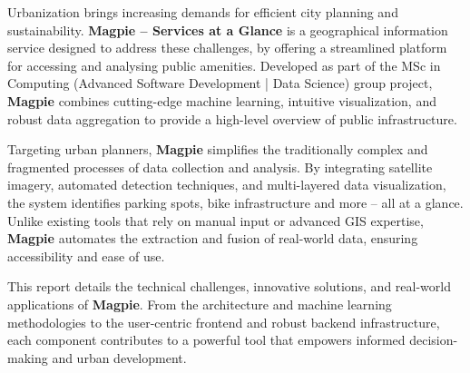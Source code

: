 Urbanization brings increasing demands for efficient city planning and
sustainability. \textbf{Magpie – Services at a Glance} is a geographical
information service designed to address these challenges, by offering a
streamlined platform for accessing and analysing public amenities. Developed as
part of the MSc in Computing (Advanced Software Development | Data Science)
group project, \textbf{Magpie} combines cutting-edge machine learning, intuitive
visualization, and robust data aggregation to provide a high-level overview of
public infrastructure.

Targeting urban planners, \textbf{Magpie} simplifies the traditionally complex
and fragmented processes of data collection and analysis. By integrating
satellite imagery, automated detection techniques, and multi-layered data
visualization, the system identifies parking spots, bike infrastructure and more
-- all at a glance. Unlike existing tools that rely on manual input or advanced
GIS expertise, \textbf{Magpie} automates the extraction and fusion of real-world
data, ensuring accessibility and ease of use.

This report details the technical challenges, innovative solutions, and
real-world applications of \textbf{Magpie}. From the architecture and machine
learning methodologies to the user-centric frontend and robust backend
infrastructure, each component contributes to a powerful tool that empowers
informed decision-making and urban development.
